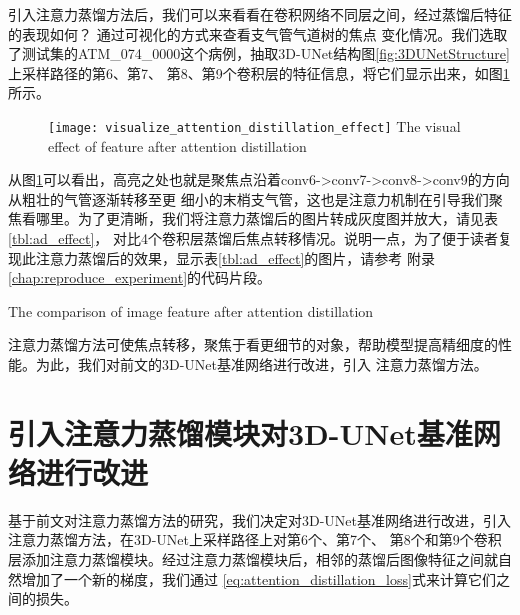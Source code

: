 引入注意力蒸馏方法后，我们可以来看看在卷积网络不同层之间，经过蒸馏后特征的表现如何？ 通过可视化的方式来查看支气管气道树的焦点
变化情况。我们选取了测试集的ATM\_074\_0000这个病例，抽取3D-UNet结构图\ref{fig:3DUNetStructure}上采样路径的第6、第7、
第8、第9个卷积层的特征信息，将它们显示出来，如图\ref{fig:ad_effect}所示。
\begin{figure}[ht]
    \centering
    \texttt{[image: visualize\_attention\_distillation\_effect]}
        {The visual effect of feature after attention distillation}
    \label{fig:ad_effect}
\end{figure}
从图\ref{fig:ad_effect}可以看出，高亮之处也就是聚焦点沿着conv6->conv7->conv8->conv9的方向从粗壮的气管逐渐转移至更
细小的末梢支气管，这也是注意力机制在引导我们聚焦看哪里。为了更清晰，我们将注意力蒸馏后的图片转成灰度图并放大，请见表\ref{tbl:ad_effect}，
对比4个卷积层蒸馏后焦点转移情况。说明一点，为了便于读者复现此注意力蒸馏后的效果，显示表\ref{tbl:ad_effect}的图片，请参考
附录\ref{chap:reproduce_experiment}的代码片段。
\begin{table}[!htp]
    \centering
        {The comparison of image feature after attention distillation}
    \label{tbl:ad_effect}
\end{table}

注意力蒸馏方法可使焦点转移，聚焦于看更细节的对象，帮助模型提高精细度的性能。为此，我们对前文的3D-UNet基准网络进行改进，引入
注意力蒸馏方法。

\section{引入注意力蒸馏模块对3D-UNet基准网络进行改进}
基于前文对注意力蒸馏方法的研究，我们决定对3D-UNet基准网络进行改进，引入注意力蒸馏方法，在3D-UNet上采样路径上对第6个、第7个、
第8个和第9个卷积层添加注意力蒸馏模块。经过注意力蒸馏模块后，相邻的蒸馏后图像特征之间就自然增加了一个新的梯度，我们通过
\ref{eq:attention_distillation_loss}式来计算它们之间的损失。

